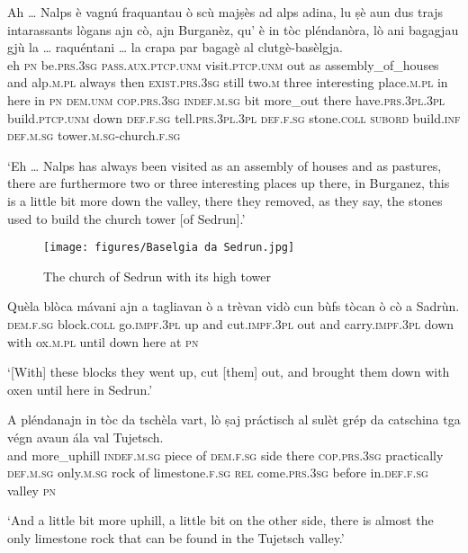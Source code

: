 \begin{linenumbers}
\gll Ah … Nalps è vagnú fraquantau ò scù majṣès ad alps adina, lu ṣè aun dus trajs intarassants lògans ajn cò, ajn Burganèz, qu' è in tòc pléndanòra, lò ani bagagjau gjù la … raquéntani … la crapa par bagagè al clutgè-basèlgja.\\
eh {}  \textsc{pn}  be.\textsc{prs.3sg} \textsc{pass.aux.ptcp.unm} visit.\textsc{ptcp.unm} out as assembly\_of\_houses and alp.\textsc{m.pl} always then \textsc{exist.prs.3sg} still two.\textsc{m} three interesting place.\textsc{m.pl} in here in \textsc{pn} \textsc{dem.unm} \textsc{cop.prs.3sg} \textsc{indef.m.sg} bit more\_out there have.\textsc{prs.3pl.3pl} build.\textsc{ptcp.unm} down \textsc{def.f.sg} {} tell.\textsc{prs.3pl.3pl} {} \textsc{def.f.sg} stone.\textsc{coll} \textsc{subord} build.\textsc{inf}  \textsc{def.m.sg} tower.\textsc{m.sg}-church.\textsc{f.sg}  \\
\end{linenumbers}
\medskip
\glt `Eh … Nalps has always been visited as an assembly of houses and as pastures, there are furthermore two or three interesting places up there, in Burganez, this is a little bit more down the valley, there they removed, as they say, the stones used to build the church tower [of Sedrun].'
\medskip

\begin{figure}
	\texttt{[image: figures/Baselgia da Sedrun.jpg]}
	\caption{The church of Sedrun with its high tower}
\end{figure}

\begin{linenumbers}
\gll   Quèla blòca mávani ajn a tagliavan ò a trèvan vidò cun bùfs tòcan ò cò a Sadrùn. \\
 \textsc{dem.f.sg} block.\textsc{coll} go.\textsc{impf.3pl} up and cut.\textsc{impf.3pl} out and carry.\textsc{impf.3pl} down  with ox.\textsc{m.pl} until down here at \textsc{pn}  \\
\end{linenumbers}
\medskip
\glt `[With] these blocks they went up, cut [them] out, and brought them down with oxen until here in Sedrun.'
\medskip

\begin{linenumbers}
\gll   A pléndanajn in tòc da tschèla vart, lò ṣaj práctisch al sulèt grép da catschina tga végn avaun ála val Tujetsch. \\
and more\_uphill \textsc{indef.m.sg} piece of \textsc{dem.f.sg} side there \textsc{cop.prs.3sg} practically \textsc{def.m.sg} only.\textsc{m.sg} rock of limestone.\textsc{f.sg} \textsc{rel} come.\textsc{prs.3sg} before in.\textsc{def.f.sg} valley \textsc{pn}   \\
\end{linenumbers}
\medskip
\glt `And a little bit more uphill, a little bit on the other side, there is almost the only limestone rock that can be found in the Tujetsch valley.'
\medskip

